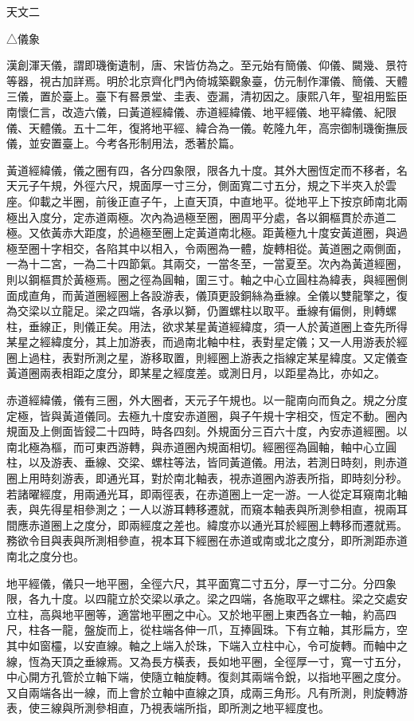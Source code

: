 
\begin{pinyinscope}
天文二

△儀象

漢創渾天儀，謂即璣衡遺制，唐、宋皆仿為之。至元始有簡儀、仰儀、闚幾、景符等器，視古加詳焉。明於北京齊化門內倚城築觀象臺，仿元制作渾儀、簡儀、天體三儀，置於臺上。臺下有晷景堂、圭表、壺漏，清初因之。康熙八年，聖祖用監臣南懷仁言，改造六儀，曰黃道經緯儀、赤道經緯儀、地平經儀、地平緯儀、紀限儀、天體儀。五十二年，復將地平經、緯合為一儀。乾隆九年，高宗御制璣衡撫辰儀，並安置臺上。今考各形制用法，悉著於篇。

黃道經緯儀，儀之圈有四，各分四象限，限各九十度。其外大圈恆定而不移者，名天元子午規，外徑六尺，規面厚一寸三分，側面寬二寸五分，規之下半夾入於雲座。仰載之半圈，前後正直子午，上直天頂，中直地平。從地平上下按京師南北兩極出入度分，定赤道兩極。次內為過極至圈，圈周平分處，各以鋼樞貫於赤道二極。又依黃赤大距度，於過極至圈上定黃道南北極。距黃極九十度安黃道圈，與過極至圈十字相交，各陷其中以相入，令兩圈為一體，旋轉相從。黃道圈之兩側面，一為十二宮，一為二十四節氣。其兩交，一當冬至，一當夏至。次內為黃道經圈，則以鋼樞貫於黃極焉。圈之徑為圓軸，圍三寸。軸之中心立圓柱為緯表，與經圈側面成直角，而黃道圈經圈上各設游表，儀頂更設銅絲為垂線。全儀以雙龍擎之，復為交梁以立龍足。梁之四端，各承以獅，仍置螺柱以取平。垂線有偏側，則轉螺柱，垂線正，則儀正矣。用法，欲求某星黃道經緯度，須一人於黃道圈上查先所得某星之經緯度分，其上加游表，而過南北軸中柱，表對星定儀；又一人用游表於經圈上過柱，表對所測之星，游移取置，則經圈上游表之指線定某星緯度。又定儀查黃道圈兩表相距之度分，即某星之經度差。或測日月，以距星為比，亦如之。

赤道經緯儀，儀有三圈，外大圈者，天元子午規也。以一龍南向而負之。規之分度定極，皆與黃道儀同。去極九十度安赤道圈，與子午規十字相交，恆定不動。圈內規面及上側面皆鋟二十四時，時各四刻。外規面分三百六十度，內安赤道經圈。以南北極為樞，而可東西游轉，與赤道圈內規面相切。經圈徑為圓軸，軸中心立圓柱，以及游表、垂線、交梁、螺柱等法，皆同黃道儀。用法，若測日時刻，則赤道圈上用時刻游表，即通光耳，對於南北軸表，視赤道圈內游表所指，即時刻分秒。若諸曜經度，用兩通光耳，即兩徑表，在赤道圈上一定一游。一人從定耳窺南北軸表，與先得星相參測之；一人以游耳轉移遷就，而窺本軸表與所測參相直，視兩耳間應赤道圈上之度分，即兩經度之差也。緯度亦以通光耳於經圈上轉移而遷就焉。務欲令目與表與所測相參直，視本耳下經圈在赤道或南或北之度分，即所測距赤道南北之度分也。

地平經儀，儀只一地平圈，全徑六尺，其平面寬二寸五分，厚一寸二分。分四象限，各九十度。以四龍立於交梁以承之。梁之四端，各施取平之螺柱。梁之交處安立柱，高與地平圈等，適當地平圈之中心。又於地平圈上東西各立一軸，約高四尺，柱各一龍，盤旋而上，從柱端各伸一爪，互捧圓珠。下有立軸，其形扁方，空其中如窗欞，以安直線。軸之上端入於珠，下端入立柱中心，令可旋轉。而軸中之線，恆為天頂之垂線焉。又為長方橫表，長如地平圈，全徑厚一寸，寬一寸五分，中心開方孔管於立軸下端，使隨立軸旋轉。復剡其兩端令銳，以指地平圈之度分。又自兩端各出一線，而上會於立軸中直線之頂，成兩三角形。凡有所測，則旋轉游表，使三線與所測參相直，乃視表端所指，即所測之地平經度也。


\end{pinyinscope}
